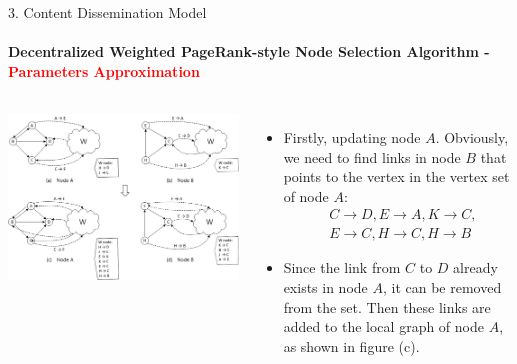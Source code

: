 \documentclass{beamer}		%
\begin{document}
\begin{frame}{3. Content Dissemination Model}
\framesubtitle{Decentralized Weighted PageRank-style Node Selection Algorithm - \textcolor{red}{Parameters Approximation}}
\begin{columns}
\includegraphics[scale=0.048]{Fig3.png}
\begin{itemize}
    \item Firstly, updating node $A$. Obviously, we need to find links in node $B$ that points to the vertex in the vertex set of node $A$: 
    \begin{align*}
    &C\rightarrow D, E\rightarrow A, K\rightarrow C,\\
    &E\rightarrow C, H\rightarrow C, H\rightarrow B
    \end{align*}
    
    
    \item Since the link from $C$ to $D$ already exists in node $A$, it can be removed from the set. Then these links are added to the local graph of node $A$, as shown in figure (c).
\end{itemize}
\end{columns}
\end{frame}
\end{document}
